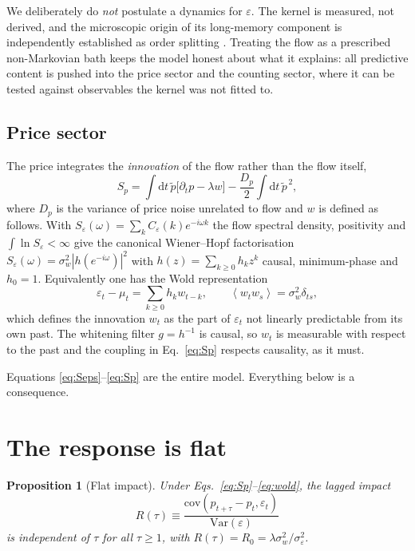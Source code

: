 \documentclass[aps,pre,twocolumn,superscriptaddress,floatfix,nofootinbib]{revtex4-2}
\newcommand{\eps}{\varepsilon}
\newcommand{\avg}[1]{\left\langle #1 \right\rangle}
\newcommand{\Var}{\mathrm{Var}}
\newcommand{\dd}{\mathrm{d}}
\newtheorem{proposition}{Proposition}
\begin{document}
We deliberately do \emph{not} postulate a dynamics for $\eps$. The kernel is
measured, not derived, and the microscopic origin of its long-memory component
is independently established as order splitting
\cite{lillo2005,sato2023prl,sato2023prr}. Treating the flow as a prescribed
non-Markovian bath keeps the model honest about what it explains: all predictive
content is pushed into the price sector and the counting sector, where it can be
tested against observables the kernel was not fitted to.

\subsection{Price sector}

The price integrates the \emph{innovation} of the flow rather than the flow
itself,
\begin{equation}
  S_p = \int\!\dd t\, \tilde p\bigl[\partial_t p-\lambda w\bigr]
      - \frac{D_p}{2}\int\!\dd t\, \tilde p^{\,2} ,
  \label{eq:Sp}
\end{equation}
where $D_p$ is the variance of price noise unrelated to flow and $w$ is defined
as follows. With $S_\eps(\omega)=\sum_k C_\eps(k)e^{-i\omega k}$ the flow
spectral density, positivity and $\int\ln S_\eps<\infty$ give the canonical
Wiener--Hopf factorisation $S_\eps(\omega)=\sigma_w^2|h(e^{-i\omega})|^2$ with
$h(z)=\sum_{k\ge0}h_kz^k$ causal, minimum-phase and $h_0=1$. Equivalently one
has the Wold representation \cite{wold1938,hamilton1994}
\begin{equation}
  \eps_t-\mu_t=\sum_{k\ge0}h_k w_{t-k} ,
  \qquad \avg{w_tw_s}=\sigma_w^2\delta_{ts} ,
  \label{eq:wold}
\end{equation}
which defines the innovation $w_t$ as the part of $\eps_t$ not linearly
predictable from its own past. The whitening filter $g=h^{-1}$ is causal, so
$w_t$ is measurable with respect to the past and the coupling in
Eq.~\eqref{eq:Sp} respects causality, as it must.

Equations \eqref{eq:Seps}--\eqref{eq:Sp} are the entire model. Everything below
is a consequence.

\section{The response is flat}
\label{sec:flat}

\begin{proposition}[Flat impact]
\label{prop:flat}
Under Eqs.~\eqref{eq:Sp}--\eqref{eq:wold}, the lagged impact
\begin{equation}
  R(\tau)\equiv\frac{\mathrm{cov}(p_{t+\tau}-p_t,\eps_t)}{\Var(\eps)}
\end{equation}
is independent of $\tau$ for all $\tau\ge1$, with
$R(\tau)=R_0=\lambda\sigma_w^2/\sigma_\eps^2$.
\end{proposition}
\end{document}

